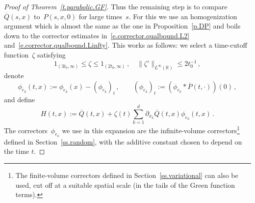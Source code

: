 \documentclass[11pt]{article} %
\numberwithin{equation}{section}
\theoremstyle{definition}
\newcommand*{\R}{\ensuremath{\mathbb{R}}}
\newcommand{\indc}{1}
\begin{document}
\begin{proof}[{Proof of Theorem~\ref{t.parabolic.GF}}]
\smallskip

Thus the remaining step is to compare~$\overline{Q}(s,x)$ to~$P(s,x,0)$ for large times~$s$. For this we use an homogenization argument which is almost the same as the one in Proposition~\ref{p.DP} and boils down to the corrector estimates in~\eqref{e.corrector.qualbound.L2} and~\eqref{e.corrector.qualbound.Linfty}. 
This works as follows: we select a time-cutoff function~$\zeta$ satisfying 
\begin{equation*}
\indc_{ (3t_0,\infty)} 
\leq 
\zeta 
\leq
\indc_{ (2t_0,\infty)}\,, 
\quad 
\| \zeta' \|_{L^\infty(\R)} \leq 2t_0^{-1}\,,
\end{equation*}
denote 
\begin{equation*} 
\phi_{e_k}(t,x) :=  \phi_{e_k}(x) - (\phi_{e_k})_t \,, \qquad  (\phi_{e_k})_t  := (\phi_{e_k} \ast \overline{P}(t,\cdot))(0)  \,,
\end{equation*}
and define 
\begin{equation*}
H(t,x):= 
\overline{Q}(t,x) 
+
\zeta(t) \sum_{k=1}^d
\partial_{x_k} \overline{Q}(t,x) 
\phi_{e_k} (t,x) 
\,.
\end{equation*}
The correctors~$\phi_{e_k}$ we use in this expansion are the infinite-volume correctors\footnote{The finite-volume correctors defined in Section~\ref{ss.variational} can also be used, cut off at a suitable spatial scale (in the tails of the Green function terms).} defined in Section~\ref{ss.random}, with the additive constant chosen to depend on the time $t$. 

\smallskip


\end{proof}
\end{document}
